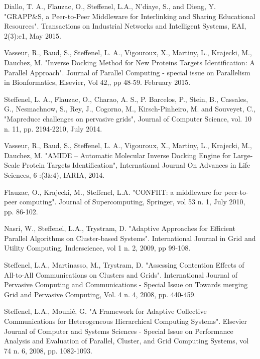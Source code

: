 \documentclass[final,twoside]{hdr} %
\begin{document}
Diallo, T. A., Flauzac, O., Steffenel, L.A., N’diaye, S., and Dieng, Y. "GRAPP\&S, a Peer-to-Peer Middleware for Interlinking and Sharing Educational Resources". Transactions on Industrial Networks and Intelligent Systems, EAI, 2(3):e1, May 2015. 

Vasseur, R., Baud, S., Steffenel, L. A., Vigouroux, X., Martiny, L., Krajecki, M., Dauchez, M. "Inverse Docking Method for New Proteins Targets Identification: A Parallel Approach". Journal of Parallel Computing - special issue on Parallelism in Bionformatics, Elsevier, Vol 42,, pp 48-59. February 2015. 

Steffenel, L. A., Flauzac, O., Charao, A. S., P. Barcelos, P., Stein, B., Cassales, G., Nesmachnow, S., Rey, J., Cogorno, M., Kirsch-Pinheiro, M. and Souveyet, C., "Mapreduce challenges on pervasive grids", Journal of Computer Science, vol. 10 n. 11, pp. 2194-2210, July 2014. 

Vasseur, R., Baud, S., Steffenel, L. A., Vigouroux, X., Martiny, L., Krajecki, M., Dauchez, M.  "AMIDE – Automatic Molecular Inverse Docking Engine for Large-Scale Protein Targets Identification", International Journal On Advances in Life Sciences, 6 :(3\&4), IARIA, 2014.

Flauzac, O., Krajecki, M., Steffenel, L.A. "CONFIIT: a middleware for peer-to-peer computing". Journal of Supercomputing, Springer, vol 53 n. 1, July 2010, pp. 86-102. 

Nasri, W., Steffenel, L.A., Trystram, D. "Adaptive Approaches for Efficient Parallel Algorithms on Cluster-based Systems". International Journal in Grid and Utility Computing, Inderscience, vol 1 n. 2, 2009, pp 99-108. 

Steffenel, L.A., Martinasso, M., Trystram, D. "Assessing Contention Effects of All-to-All Communications on Clusters and Grids". International Journal of Pervasive Computing and Communications - Special Issue on Towards merging Grid and Pervasive Computing, Vol. 4 n. 4, 2008, pp. 440-459. 

Steffenel, L.A., Mounié, G. "A Framework for Adaptive Collective Communications for Heterogeneous Hierarchical Computing Systems". Elsevier Journal of Computer and Systems Sciences - Special Issue on Performance Analysis and Evaluation of Parallel, Cluster, and Grid Computing Systems, vol 74 n. 6, 2008, pp. 1082-1093.

%
%
\end{document}
